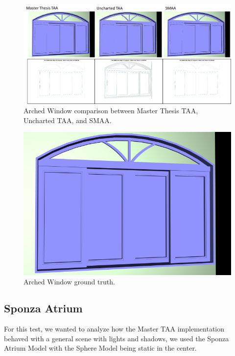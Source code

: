 \documentclass[pregrado]{tesis-usb} %
\begin{document}
\begin{figure}[H]
	\centering
	\includegraphics[scale=0.8]{images/results/window_arch.png}
	\caption{Arched Window comparison between Master Thesis TAA, Uncharted TAA, and SMAA.}\label{fig:window_arch_render}
\end{figure}

\begin{figure}[H]
	\centering
	\includegraphics[scale=0.18]{images/results/window_arch_sobel_ground_truth.png}
	\caption{Arched Window ground truth.}\label{fig:window_arch_truth}
\end{figure}

\subsection{Sponza Atrium}
For this test, we wanted to analyze how the Master TAA implementation behaved with a general scene with lights and shadows, we used the Sponza Atrium Model with the Sphere Model being static in the center.
\end{document}

